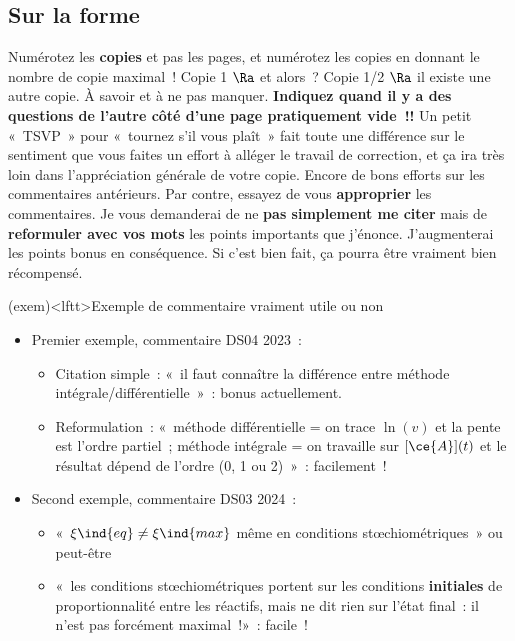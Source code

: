 \documentclass[a4paper, 10pt, final, garamond]{book}
\begin{document}
\subsection{Sur la forme}
Numérotez les \textbf{copies} et pas les pages, et numérotez les copies en
donnant le nombre de copie maximal~! Copie 1 $\Ra$ et alors~? Copie 1/2 $\Ra$ il
existe une autre copie. À savoir et à ne pas manquer.
\smallbreak
\textbf{Indiquez quand il y a des questions de l'autre côté d'une page
	pratiquement vide~!!} Un petit «~TSVP~» pour «~tournez s'il vous plaît~» fait
toute une différence sur le sentiment que vous faites un effort à alléger le
travail de correction, et ça ira très loin dans l'appréciation générale de votre
copie.
\smallbreak
Encore de bons efforts sur les commentaires antérieurs. Par contre, essayez de
vous \textbf{approprier} les commentaires. Je vous demanderai de ne \textbf{pas
	simplement me citer} mais de \textbf{reformuler avec vos mots} les points
importants que j'énonce. J'augmenterai les points bonus en conséquence. Si c'est
bien fait, ça pourra être vraiment bien récompensé.
\begin{tcn}(exem)<lftt>{Exemple de commentaire vraiment utile ou non}
	\begin{itemize}
		\item Premier exemple, commentaire DS04 2023~:
		      \begin{itemize}
			      \item Citation simple~: «~il faut connaître la différence entre
			            méthode intégrale/différentielle~»~:  bonus
			            actuellement.
			      \item Reformulation~: «~méthode différentielle = on trace $\ln (v)$
			            et la pente est l'ordre partiel~; méthode intégrale = on
			            travaille sur $[\ce{A}](t)$ et le résultat dépend de l'ordre
			            (0, 1 ou 2)~»~:  facilement~!
		      \end{itemize}
		\item Second exemple, commentaire DS03 2024~:
		      \begin{itemize}
			      \item «~$\xi\ind{eq} \neq \xi\ind{max}$ même en conditions
			            stœchiométriques~»  ou peut-être 
			      \item «~les conditions stœchiométriques portent sur les conditions
			            \textbf{initiales} de proportionnalité entre les réactifs,
			            mais ne dit rien sur l'état final~: il n'est pas forcément
			            maximal~!»~:  facile~!
		      \end{itemize}
	\end{itemize}
\end{tcn}
\end{document}
